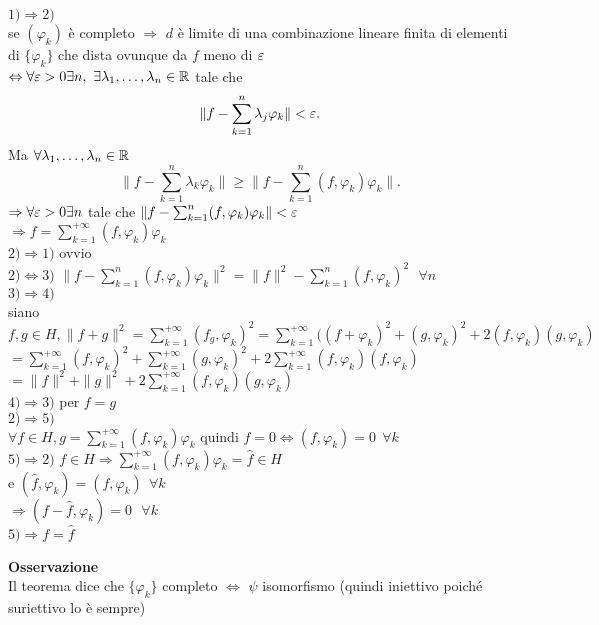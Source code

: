 \documentclass[12px]{article}
\begin{document}
\begin{dimo}
	$1) \Rightarrow  2)$ \\
se $( \varphi_k)$ è completo $ \Rightarrow  $ $d$ è limite di una combinazione lineare finita di elementi di  $\{ \varphi_k\}$ che dista ovunque da $f$ meno di $\varepsilon$ \\
$ \Leftrightarrow \forall \varepsilon > 0 \exists n, \ \exists \lambda_1, \ldots, \lambda_n\in\mathbb{R}$ tale che 
\[
\|f- \sum^{n}_{k = 1} \lambda_j \varphi_k\| < \varepsilon
.\] 
Ma $\forall \lambda_1,\ldots, \lambda_n\in \mathbb{R}$
\[
\|f - \sum^{n}_{k = 1} \lambda_k \varphi_k \| \geq \| f - \sum^{n}_{k  =1} (f, \varphi_k)  \varphi_k \|
.\] 
$ \Rightarrow  \forall\varepsilon > 0 \exists n$ tale che $\|f - \sum^{n}_{k=1}(f, \varphi_k) \varphi_k\| < \varepsilon$\\
$ \Rightarrow  f = \sum^{+\infty}_{k =1}(f, \varphi_k) \varphi_k$ \\
$ 2) \Rightarrow  1)$ ovvio\\
$ 2) \Leftrightarrow  3)$ $\| f- \sum^{n}_{k=1}(f, \varphi_k) \varphi_k \|^2= \|f\|^2 - \sum^{n}_{k=1}(f, \varphi_k)^2\ \ \ \forall n$\\
$3) \Rightarrow 4)$\\
siano $\displaystyle f,g\in H, \|f+g\|^2 = \sum^{+\infty}_{k=1}(f_g, \varphi_k)^2 = \sum^{+\infty}_{k=1}((f+ \varphi_k)^2 + (g, \varphi_k)^2 + 2(f, \varphi_k)(g, \varphi_k)$\\
$\displaystyle =\sum^{+\infty}_{k = 1}(f, \varphi_k)^2 + \sum^{+\infty}_{k=1}(g, \varphi_k)^2 + 2 \sum^{+\infty}_{k=1}(f , \varphi_k)(f, \varphi_k)$\\
$ = \displaystyle \|f\|^2 + \|g\|^2 + 2 \sum^{+\infty}_{k=1}(f, \varphi_k)( g, \varphi_k)$\\
$4) \Rightarrow 3)$  per $f = g$\\
 $2) \Rightarrow  5)$ \\
 $\forall f\in H, g = \sum^{+\infty}_{k=1} (f, \varphi_k) \varphi_k$ quindi $f = 0 \Leftrightarrow (f, \varphi_k) = 0 \ \ \forall k$\\
 $ 5) \Rightarrow  2)$ $f\in H  \Rightarrow \sum^{+\infty}_{k=1}(f, \varphi_k) \varphi_k = \hat f \in H$ \\
 e $(\hat f, \varphi_k) = (f, \varphi_k) \ \ \forall k$\\
 $ \Rightarrow (f - \hat f, \varphi_k) = 0 \ \ \ \forall k $\\
 $5) \Rightarrow  f = \hat f$
\end{dimo}
\textbf{Osservazione}\\
Il teorema dice che $\{ \varphi_k\}$ completo $ \Leftrightarrow$ $\psi$ isomorfismo (quindi iniettivo poiché suriettivo lo è sempre)\\
\end{document}
